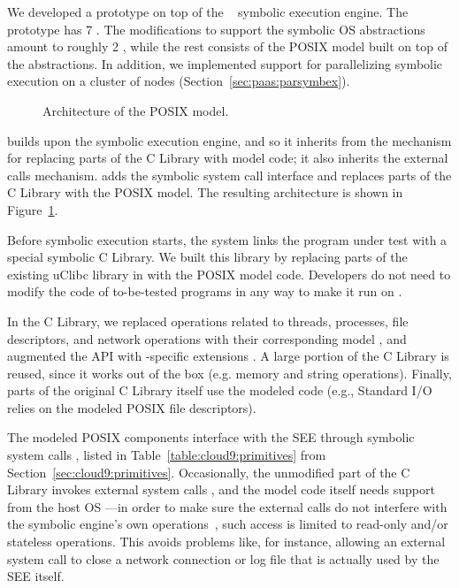 We developed a \cnine prototype on top of the \klee~\cite{klee} symbolic execution engine.  The prototype has 7 \kloc.
%
The \klee modifications to support the symbolic OS abstractions amount to roughly 2 \kloc, while the rest consists of the POSIX model built on top of the abstractions.
%
In addition, we implemented support for parallelizing symbolic execution on a cluster of nodes (Section~\ref{sec:paas:parsymbex}).

\begin{figure}[h!]
  \centering
  \caption{Architecture of the \cnine POSIX model.}
  \label{fig:cloud9:posixmodel}
\end{figure}

\cnine builds upon the \klee symbolic execution engine, and so it inherits from \klee the mechanism for replacing parts of the C Library with model code; it also inherits the external calls mechanism.  \cnine adds the symbolic system call interface and replaces parts of the C Library with the POSIX model.  The resulting architecture is shown in Figure~\ref{fig:cloud9:posixmodel}.

Before symbolic execution starts, the \cnine system links the program under test with a special symbolic C Library.
%
We built this library by replacing parts of the existing uClibc library in \klee with the POSIX model code.  Developers do not need to modify the code of to-be-tested programs in any way to make it run on \cnine.  

In the C Library, we replaced operations related to threads, processes, file descriptors, and network operations with their corresponding model \cI, and augmented the API with \cnine-specific extensions \cII.
%
A large portion of the C Library is reused, since it works out of the box \cIII (e.g. memory and string operations).  Finally, parts of the original C Library itself use  the modeled code \cIV (e.g., Standard I/O  relies on the modeled POSIX file descriptors).

The modeled POSIX components interface with the SEE through symbolic system calls \cV, listed in Table~\ref{table:cloud9:primitives} from Section~\ref{sec:cloud9:primitives}.
%
Occasionally, the unmodified part of the C Library invokes external system calls \cVI, and the model code itself needs support from the host OS \cVII---in order to make sure the external calls do not interfere with the symbolic engine's own operations~\cVIII, such access is limited to read-only and/or stateless operations.  This avoids problems like, for instance, allowing an external  system call to close a network connection or log file that is actually used by the SEE itself.

